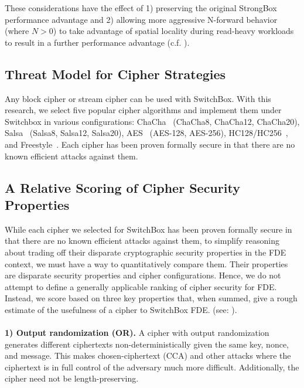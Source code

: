 These considerations have the effect of 1) preserving the original StrongBox
performance advantage and 2) allowing more aggressive N-forward behavior (where
$N > 0$) to take advantage of spatial locality during read-heavy workloads to
result in a further performance advantage (c.f. ).

\subsection{Threat Model for Cipher Strategies}

Any block cipher or stream cipher can be used with SwitchBox. With this
research, we select five popular cipher algorithms and implement them under
Switchbox in various configurations: ChaCha~\cite{ChaCha20} (ChaCha8, ChaCha12,
ChaCha20), Salsa~\cite{SalsaX} (Salsa8, Salsa12, Salsa20), AES~\cite{AES}
(AES-128, AES-256), HC128/HC256~\cite{HCX}, and Freestyle~\cite{Freestyle}. Each
cipher has been proven formally secure in that there are no known efficient
attacks against them.

\subsection{A Relative Scoring of Cipher Security Properties}

While each cipher we selected for SwitchBox has been proven formally secure in
that there are no known efficient attacks against them, to simplify
reasoning about trading off their disparate cryptographic security
properties in the FDE context, we must have a way to quantitatively compare
them. Their properties are disparate security properties and cipher
configurations. Hence, we do not attempt to define a generally applicable
ranking of cipher security for FDE. Instead, we score based on three key
properties that, when summed, give a rough estimate of the usefulness of a
cipher to SwitchBox FDE. (see: ).\\
\\
\textbf{1) Output randomization (OR).} A cipher with output randomization
generates different ciphertexts non-deterministically given the same key, nonce,
and message. This makes chosen-ciphertext (CCA) and other attacks where the
ciphertext is in full control of the adversary much more difficult.
Additionally, the cipher need not be length-preserving.

